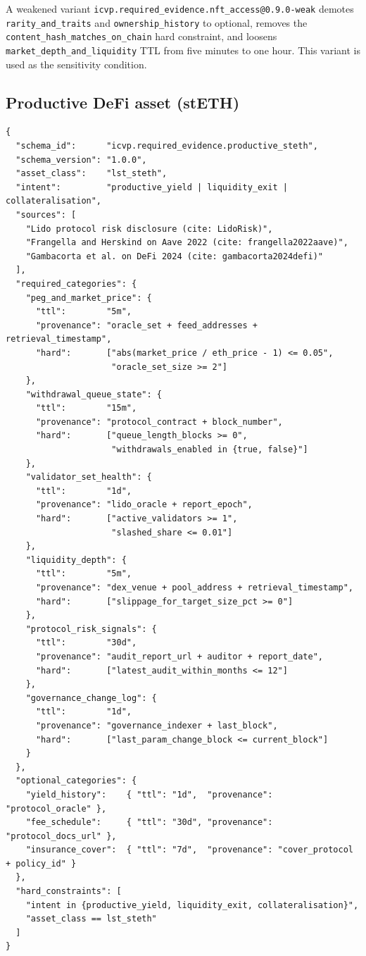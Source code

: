 A weakened variant \texttt{icvp.required\_evidence.nft\_access@0.9.0-weak} demotes \texttt{rarity\_and\_traits} and \texttt{ownership\_history} to optional, removes the \texttt{content\_hash\_matches\_on\_chain} hard constraint, and loosens \texttt{market\_depth\_and\_liquidity} TTL from five minutes to one hour. This variant is used as the sensitivity condition.

\subsection{Productive DeFi asset (stETH)}
\label{app:schema-steth}

\begin{verbatim}
{
  "schema_id":      "icvp.required_evidence.productive_steth",
  "schema_version": "1.0.0",
  "asset_class":    "lst_steth",
  "intent":         "productive_yield | liquidity_exit | collateralisation",
  "sources": [
    "Lido protocol risk disclosure (cite: LidoRisk)",
    "Frangella and Herskind on Aave 2022 (cite: frangella2022aave)",
    "Gambacorta et al. on DeFi 2024 (cite: gambacorta2024defi)"
  ],
  "required_categories": {
    "peg_and_market_price": {
      "ttl":        "5m",
      "provenance": "oracle_set + feed_addresses + retrieval_timestamp",
      "hard":       ["abs(market_price / eth_price - 1) <= 0.05",
                     "oracle_set_size >= 2"]
    },
    "withdrawal_queue_state": {
      "ttl":        "15m",
      "provenance": "protocol_contract + block_number",
      "hard":       ["queue_length_blocks >= 0",
                     "withdrawals_enabled in {true, false}"]
    },
    "validator_set_health": {
      "ttl":        "1d",
      "provenance": "lido_oracle + report_epoch",
      "hard":       ["active_validators >= 1",
                     "slashed_share <= 0.01"]
    },
    "liquidity_depth": {
      "ttl":        "5m",
      "provenance": "dex_venue + pool_address + retrieval_timestamp",
      "hard":       ["slippage_for_target_size_pct >= 0"]
    },
    "protocol_risk_signals": {
      "ttl":        "30d",
      "provenance": "audit_report_url + auditor + report_date",
      "hard":       ["latest_audit_within_months <= 12"]
    },
    "governance_change_log": {
      "ttl":        "1d",
      "provenance": "governance_indexer + last_block",
      "hard":       ["last_param_change_block <= current_block"]
    }
  },
  "optional_categories": {
    "yield_history":    { "ttl": "1d",  "provenance": "protocol_oracle" },
    "fee_schedule":     { "ttl": "30d", "provenance": "protocol_docs_url" },
    "insurance_cover":  { "ttl": "7d",  "provenance": "cover_protocol + policy_id" }
  },
  "hard_constraints": [
    "intent in {productive_yield, liquidity_exit, collateralisation}",
    "asset_class == lst_steth"
  ]
}
\end{verbatim}

